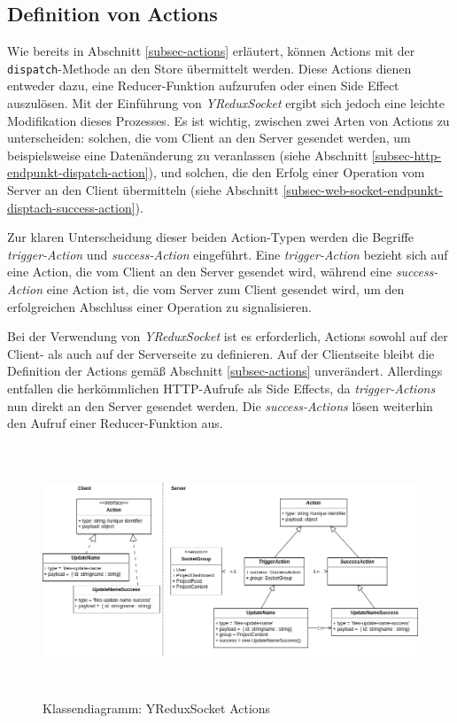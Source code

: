 \documentclass[12pt]{book}          %
\begin{document}
\subsection{Definition von Actions}
\label{subsec-definition-von-actions}

Wie bereits in Abschnitt \ref{subsec-actions} erläutert, können Actions mit der \texttt{dispatch}-Methode an den Store übermittelt werden. Diese Actions dienen entweder dazu, eine Reducer-Funktion aufzurufen oder einen Side Effect auszulösen. Mit der Einführung von \textit{YReduxSocket} ergibt sich jedoch eine leichte Modifikation dieses Prozesses. Es ist wichtig, zwischen zwei Arten von Actions zu unterscheiden: solchen, die vom Client an den Server gesendet werden, um beispielsweise eine Datenänderung zu veranlassen (siehe Abschnitt \ref{subsec-http-endpunkt-dispatch-action}), und solchen, die den Erfolg einer Operation vom Server an den Client übermitteln (siehe Abschnitt \ref{subsec-web-socket-endpunkt-disptach-success-action}).

Zur klaren Unterscheidung dieser beiden Action-Typen werden die Begriffe \textit{trigger-Action} und \textit{success-Action} eingeführt. Eine \textit{trigger-Action} bezieht sich auf eine Action, die vom Client an den Server gesendet wird, während eine \textit{success-Action} eine Action ist, die vom Server zum Client gesendet wird, um den erfolgreichen Abschluss einer Operation zu signalisieren.

Bei der Verwendung von \textit{YReduxSocket} ist es erforderlich, Actions sowohl auf der Client- als auch auf der Serverseite zu definieren. Auf der Clientseite bleibt die Definition der Actions gemäß Abschnitt \ref{subsec-actions} unverändert. Allerdings entfallen die herkömmlichen HTTP-Aufrufe als Side Effects, da \textit{trigger-Actions} nun direkt an den Server gesendet werden. Die \textit{success-Actions} lösen weiterhin den Aufruf einer Reducer-Funktion aus.

\begin{figure}[htbp]
\centering
\includegraphics[height=7.5cm]{abbildungen/y-redux-socket-actions.png}
\caption{Klassendiagramm: YReduxSocket Actions}
\label{abb-klassendiagramm-y-redux-socket-actions}
\end{figure}
\end{document}
